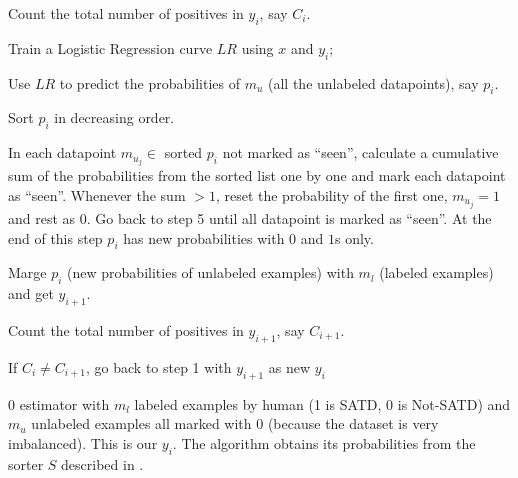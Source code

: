 \begin{algorithm}[!t]
\small
\be
\item Count the total number of positives in $y_i$, say $C_i$.
\item Train a Logistic Regression curve $LR$ using $x$ and $y_i$;
\item Use $LR$ to predict the probabilities of $m_{u}$ (all the unlabeled datapoints), say $p_i$. 
\item Sort $p_i$ in decreasing order.
\item In each datapoint $m_{u_j} \in $ sorted $p_i$ not marked as ``seen'', calculate a cumulative sum of the
probabilities from the sorted list one by one and mark each datapoint as ``seen''. Whenever the sum $> 1$, 
reset the probability of the first one, $m_{u_j}=1$ and rest as 0. Go back to step 5 until all datapoint is marked as ``seen''. At the end of this step $p_i$ has new probabilities with $0$ and $1$s only.
\item Marge $p_i$ (new probabilities of unlabeled examples) with $m_l$ (labeled examples) and get $y_{i+1}$.
\item Count the total number of positives in $y_{i+1}$, say $C_{i+1}$.
\item If $C_i \neq C_{i+1}$, go back to step 1 with $y_{i+1}$ as new $y_i$
\ee
\caption{  {\IT}0 estimator with $m_{l}$ labeled examples by human (1 is SATD, 0 is Not-SATD) and $m_{u}$ unlabeled examples all marked with $0$ (because the dataset is very imbalanced). This is our $y_i$. 
The algorithm obtains its probabilities from the sorter $S$
described in . }\label{algo:estimator}
  \end{algorithm}